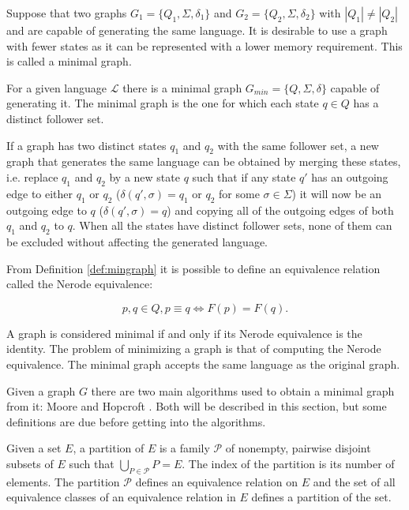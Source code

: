 {Suppose that two graphs $G_1 = \{Q_1, \Sigma, \delta_1\}$ and $G_2 = \{Q_2, \Sigma, \delta_2\}$ with $|Q_1|\neq |Q_2|$ and are capable of generating the same language. It is desirable to use a graph with fewer states as it can be represented with a lower memory requirement. This is called a minimal graph. 

\begin{definition}\label{def:mingraph}
For a given language $\mathcal{L}$ there is a minimal graph $G_{min} = \{Q,\Sigma ,\delta \}$ capable of generating it. The minimal graph is the one for which each state $q \in Q$ has a distinct follower set.
\end{definition}

If a graph has two distinct states $q_1$ and $q_2$ with the same follower set, a new graph that generates the same language can be obtained by merging these states, i.e. replace $q_1$ and $q_2$ by a new state $q$ such that if any state $q\prime$ has an outgoing edge to either $q_1$ or $q_2$ ($\delta(q\prime,\sigma) = q_1$ or $q_2$ for some $\sigma\in\Sigma$) it will now be an outgoing edge to $q$ ($\delta(q\prime,\sigma) = q$) and copying all of the outgoing edges of both $q_1$ and $q_2$ to $q$. When all the states have distinct follower sets, none of them can be excluded without affecting the generated language.

From Definition \ref{def:mingraph} it is possible to define an equivalence relation called the Nerode equivalence:

\[
p, q \in Q, p \equiv q \Leftrightarrow F(p) = F(q).
\]

\noindent A graph is considered minimal if and only if its Nerode equivalence is the identity. The problem of minimizing a graph is that of computing the Nerode equivalence. The minimal graph accepts the same language as the original graph.


Given a graph $G$ there are two main algorithms used to obtain a minimal graph from it: Moore and Hopcroft \cite{berstel.10}. Both will be described in this section, but some definitions are due before getting into the algorithms.

\begin{definition}\label{def:partition}
Given a set $E$, a partition of $E$ is a family $\mathcal{P}$ of nonempty, pairwise disjoint subsets of $E$ such that $\bigcup_{P\in\mathcal{P}}P = E $. The index of the partition is its number of elements. The partition $\mathcal{P}$ defines an equivalence relation on $E$ and the set of all equivalence classes of an equivalence relation in $E$ defines a partition of the set.
\end{definition}

}
